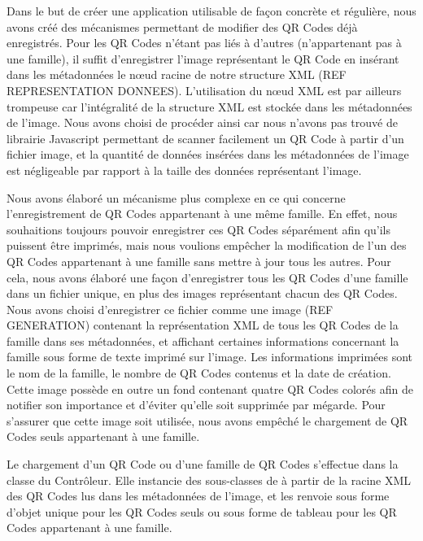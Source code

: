 \par
Dans le but de créer une application utilisable de façon concrète et régulière, nous avons créé des mécanismes permettant de modifier des QR Codes déjà enregistrés. Pour les QR Codes n'étant pas liés à d'autres (n'appartenant pas à une famille), il suffit d'enregistrer l'image représentant le QR Code en insérant dans les métadonnées le nœud racine de notre structure XML (REF REPRESENTATION DONNEES). L'utilisation du nœud XML  est par ailleurs trompeuse car l'intégralité de la structure XML est stockée dans les métadonnées de l'image. Nous avons choisi de procéder ainsi car nous n'avons pas trouvé de librairie Javascript permettant de scanner facilement un QR Code à partir d'un fichier image, et la quantité de données insérées dans les métadonnées de l'image est négligeable par rapport à la taille des données représentant l'image.\\
\par
Nous avons élaboré un mécanisme plus complexe en ce qui concerne l'enregistrement de QR Codes appartenant à une même famille. En effet, nous souhaitions toujours pouvoir enregistrer ces QR Codes séparément afin qu'ils puissent être imprimés, mais nous voulions empêcher la modification de l'un des QR Codes appartenant à une famille sans mettre à jour tous les autres. Pour cela, nous avons élaboré une façon d'enregistrer tous les QR Codes d'une famille dans un fichier unique, en plus des images représentant chacun des QR Codes. Nous avons choisi d'enregistrer ce fichier comme une image (REF GENERATION) contenant la représentation XML de tous les QR Codes de la famille dans ses métadonnées, et affichant certaines informations concernant la famille sous forme de texte imprimé sur l'image. Les informations imprimées sont le nom de la famille, le nombre de QR Codes contenus et la date de création. Cette image possède en outre un fond contenant quatre QR Codes colorés afin de notifier son importance et d'éviter qu'elle soit supprimée par mégarde. Pour s'assurer que cette image soit utilisée, nous avons empêché le chargement de QR Codes seuls appartenant à une famille.\\
\par
Le chargement d'un QR Code ou d'une famille de QR Codes s'effectue dans la classe  du Contrôleur. Elle instancie des sous-classes de  à partir de la racine XML des QR Codes lus dans les métadonnées de l'image, et les renvoie sous forme d'objet unique pour les QR Codes seuls ou sous forme de tableau pour les QR Codes appartenant à une famille.